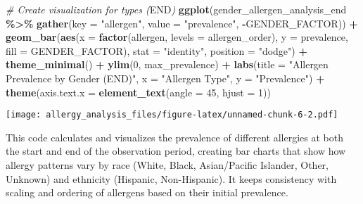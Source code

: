 \documentclass[
]{article}
\newenvironment{Shaded}{\begin{snugshade}}{\end{snugshade}}
\newcommand{\AttributeTok}[1]{\textcolor[rgb]{0.13,0.29,0.53}{#1}}
\newcommand{\CommentTok}[1]{\textcolor[rgb]{0.56,0.35,0.01}{\textit{#1}}}
\newcommand{\DecValTok}[1]{\textcolor[rgb]{0.00,0.00,0.81}{#1}}
\newcommand{\FunctionTok}[1]{\textcolor[rgb]{0.13,0.29,0.53}{\textbf{#1}}}
\newcommand{\NormalTok}[1]{#1}
\newcommand{\RegionMarkerTok}[1]{#1}
\newcommand{\SpecialCharTok}[1]{\textcolor[rgb]{0.81,0.36,0.00}{\textbf{#1}}}
\newcommand{\StringTok}[1]{\textcolor[rgb]{0.31,0.60,0.02}{#1}}
\begin{document}
\begin{Shaded}
\begin{Highlighting}[]
\CommentTok{\# Create visualization for types (}\RegionMarkerTok{END}\CommentTok{)}
\FunctionTok{ggplot}\NormalTok{(gender\_allergen\_analysis\_end }\SpecialCharTok{\%\textgreater{}\%} 
       \FunctionTok{gather}\NormalTok{(}\AttributeTok{key =} \StringTok{"allergen"}\NormalTok{, }\AttributeTok{value =} \StringTok{"prevalence"}\NormalTok{, }\SpecialCharTok{{-}}\NormalTok{GENDER\_FACTOR)) }\SpecialCharTok{+}
  \FunctionTok{geom\_bar}\NormalTok{(}\FunctionTok{aes}\NormalTok{(}\AttributeTok{x =} \FunctionTok{factor}\NormalTok{(allergen, }\AttributeTok{levels =}\NormalTok{ allergen\_order), }
               \AttributeTok{y =}\NormalTok{ prevalence, }\AttributeTok{fill =}\NormalTok{ GENDER\_FACTOR), }
           \AttributeTok{stat =} \StringTok{"identity"}\NormalTok{, }\AttributeTok{position =} \StringTok{"dodge"}\NormalTok{) }\SpecialCharTok{+}
  \FunctionTok{theme\_minimal}\NormalTok{() }\SpecialCharTok{+}
  \FunctionTok{ylim}\NormalTok{(}\DecValTok{0}\NormalTok{, max\_prevalence) }\SpecialCharTok{+}
  \FunctionTok{labs}\NormalTok{(}\AttributeTok{title =} \StringTok{"Allergen Prevalence by Gender (END)"}\NormalTok{,}
       \AttributeTok{x =} \StringTok{"Allergen Type"}\NormalTok{,}
       \AttributeTok{y =} \StringTok{"Prevalence"}\NormalTok{) }\SpecialCharTok{+}
  \FunctionTok{theme}\NormalTok{(}\AttributeTok{axis.text.x =} \FunctionTok{element\_text}\NormalTok{(}\AttributeTok{angle =} \DecValTok{45}\NormalTok{, }\AttributeTok{hjust =} \DecValTok{1}\NormalTok{))}
\end{Highlighting}
\end{Shaded}

\texttt{[image: allergy\_analysis\_files/figure-latex/unnamed-chunk-6-2.pdf]}

This code calculates and visualizes the prevalence of different
allergies at both the start and end of the observation period, creating
bar charts that show how allergy patterns vary by race (White, Black,
Asian/Pacific Islander, Other, Unknown) and ethnicity (Hispanic,
Non-Hispanic). It keeps consistency with scaling and ordering of
allergens based on their initial prevalence.
\end{document}
